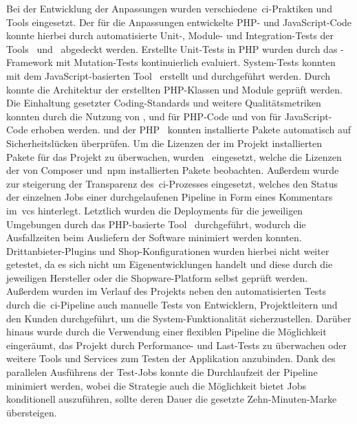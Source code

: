 Bei der Entwicklung der Anpassungen wurden verschiedene\ \acrshort{ci}-Praktiken und Tools eingesetzt.
Der für die Anpassungen entwickelte PHP- und JavaScript-Code konnte hierbei durch automatisierte Unit-, Module- und
Integration-Tests der Tools\  und\  abgedeckt werden.
Erstellte Unit-Tests in PHP wurden durch das -Framework mit Mutation-Tests kontinuierlich
evaluiert.
System-Tests konnten mit dem JavaScript-basierten Tool\  erstellt und durchgeführt werden.
Durch\  konnte die Architektur der erstellten PHP-Klassen und Module geprüft werden.
Die Einhaltung gesetzter Coding-Standards und weitere Qualitätsmetriken konnten durch die Nutzung von
,  und  für PHP-Code und von  für
JavaScript-Code erhoben werden.
 und der PHP\  konnten installierte Pakete automatisch auf
Sicherheitslücken überprüfen.
Um die Lizenzen der im Projekt installierten Pakete für das Projekt zu überwachen, wurden\ 
eingesetzt, welche die Lizenzen der von Composer und\ \acrshort{npm} installierten Pakete beobachten.
Außerdem wurde\  zur steigerung der Transparenz des\ \acrshort{ci}-Prozesses eingesetzt, welches
den Status der einzelnen Jobs einer durchgelaufenen Pipeline in Form eines Kommentars im\ \acrshort{vcs} hinterlegt.
Letztlich wurden die Deployments für die jeweiligen Umgebungen durch das PHP-basierte Tool\ 
durchgeführt, wodurch die Ausfallzeiten beim Ausliefern der Software minimiert werden konnten.\\
Drittanbieter-Plugins und Shop-Konfigurationen wurden hierbei nicht weiter getestet, da es sich nicht um
Eigenentwicklungen handelt und diese durch die jeweiligen Hersteller oder die Shopware-Platform selbst geprüft werden.
Außerdem wurden im Verlauf des Projekts neben den automatisierten Tests durch die\ \acrshort{ci}-Pipeline auch
manuelle Tests von Entwicklern, Projektleitern und den Kunden durchgeführt, um die System-Funktionalität
sicherzustellen.
Darüber hinaus wurde durch die Verwendung einer flexiblen Pipeline die Möglichkeit eingeräumt, das Projekt durch
Performance- und Last-Tests zu überwachen oder weitere Tools und Services zum Testen der Applikation anzubinden.
Dank des parallelen Ausführens der Test-Jobs konnte die Durchlaufzeit der Pipeline minimiert werden, wobei die
Strategie auch die Möglichkeit bietet Jobs konditionell auszuführen, sollte deren Dauer die gesetzte Zehn-Minuten-Marke
übersteigen.

\clearpage
